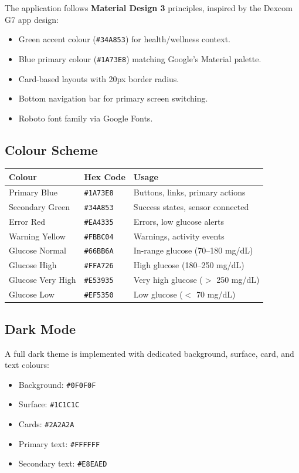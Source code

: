 \documentclass[12pt,a4paper]{article}
\begin{document}
The application follows \textbf{Material Design 3} principles, inspired by the Dexcom G7 app design:
\begin{itemize}
    \item Green accent colour (\texttt{\#34A853}) for health/wellness context.
    \item Blue primary colour (\texttt{\#1A73E8}) matching Google's Material palette.
    \item Card-based layouts with 20px border radius.
    \item Bottom navigation bar for primary screen switching.
    \item Roboto font family via Google Fonts.
\end{itemize}

\subsection{Colour Scheme}

\begin{longtable}{p{4.5cm} p{3cm} p{6.5cm}}
\toprule
\textbf{Colour} & \textbf{Hex Code} & \textbf{Usage} \\
\midrule
\endhead
Primary Blue & \texttt{\#1A73E8} & Buttons, links, primary actions \\
Secondary Green & \texttt{\#34A853} & Success states, sensor connected \\
Error Red & \texttt{\#EA4335} & Errors, low glucose alerts \\
Warning Yellow & \texttt{\#FBBC04} & Warnings, activity events \\
Glucose Normal & \texttt{\#66BB6A} & In-range glucose (70--180 mg/dL) \\
Glucose High & \texttt{\#FFA726} & High glucose (180--250 mg/dL) \\
Glucose Very High & \texttt{\#E53935} & Very high glucose ($>$ 250 mg/dL) \\
Glucose Low & \texttt{\#EF5350} & Low glucose ($<$ 70 mg/dL) \\
\bottomrule
\end{longtable}

\subsection{Dark Mode}

A full dark theme is implemented with dedicated background, surface, card, and text colours:
\begin{itemize}
    \item Background: \texttt{\#0F0F0F}
    \item Surface: \texttt{\#1C1C1C}
    \item Cards: \texttt{\#2A2A2A}
    \item Primary text: \texttt{\#FFFFFF}
    \item Secondary text: \texttt{\#E8EAED}
\end{itemize}
\end{document}
